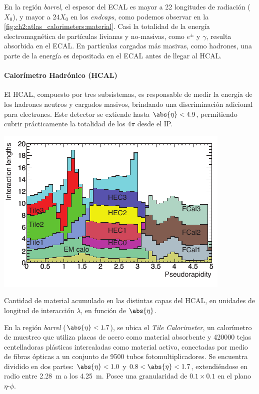 En la región \textit{barrel}, el espesor del ECAL es mayor a 22 longitudes de radiación ($X_0$), y mayor a $24 X_0$ en los \textit{endcaps}, como podemos observar en la \cref{fig:ch2:atlas_calorimeters:material}. Casi la totalidad de la energía electromagnética de partículas livianas y no-masivas, como $e^\pm$ y $\gamma$, resulta absorbida en el ECAL. En partículas cargadas más masivas, como hadrones, una parte de la energía es depositada en el ECAL antes de llegar al HCAL.

\paragraph{Calorímetro Hadrónico (HCAL)}

El HCAL, compuesto por tres subsistemas, es responsable de medir la energía de los hadrones neutros y cargados masivos, brindando una discriminación adicional para electrones. Este detector se extiende hasta $\abs{\eta} < 4.9$, permitiendo cubrir prácticamente la totalidad de los $4\pi$ desde el IP.

\begin{marginfigure}[5em]
    \centering
    \includegraphics[width=0.99\marginparwidth]{Assets/Plots/HCAL_material.pdf}
    \caption{Cantidad de material acumulado en las distintas capas del HCAL, en unidades de longitud de interacción $\lambda$, en función de $\abs{\eta}$.}
    \label{fig:ch2:atlas_calorimeters:HCAL:material}
\end{marginfigure}

En la región \textit{barrel} ($\abs{\eta} < 1.7$), se ubica el \textit{Tile Calorimeter}, un calorímetro de muestreo que utiliza placas de acero como material absorbente y 420000 tejas centelladoras plásticas intercaladas como material activo, conectadas por medio de fibras ópticas a un conjunto de 9500 tubos fotomultiplicadores. Se encuentra dividido en dos partes: $\abs{\eta} < 1.0$ y $0.8 < \abs{\eta} < 1.7$, extendiéndose en radio entre \SI{2.28}{\meter} a los \SI{4.25}{\meter}. Posee una granularidad de $0.1\times0.1$ en el plano $\eta$-$\phi$.

